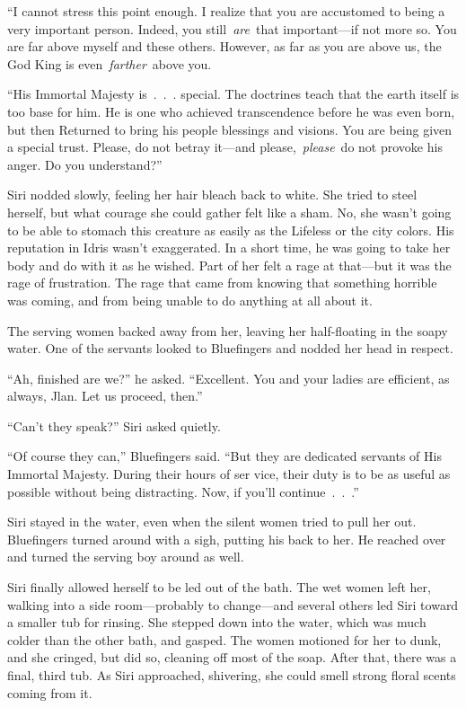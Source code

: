 “I cannot stress this point enough. I realize that you are accustomed to being a very important person. Indeed, you still~\textit{are}~that important—if not more so. You are far above myself and these others. However, as far as you are above us, the God King is even~\textit{farther}~above you.

“His Immortal Majesty is~.~.~. special. The doctrines teach that the earth itself is too base for him. He is one who achieved transcendence before he was even born, but then Returned to bring his people blessings and visions. You are being given a special trust. Please, do not betray it—and please,~\textit{please}~do not provoke his anger. Do you understand?”

Siri nodded slowly, feeling her hair bleach back to white. She tried to steel herself, but what courage she could gather felt like a sham. No, she wasn’t going to be able to stomach this creature as easily as the Lifeless or the city colors. His reputation in Idris wasn’t exaggerated. In a short time, he was going to take her body and do with it as he wished. Part of her felt a rage at that—but it was the rage of frustration. The rage that came from knowing that something horrible was coming, and from being unable to do anything at all about it.

The serving women backed away from her, leaving her half-floating in the soapy water. One of the servants looked to Bluefingers and nodded her head in respect.

“Ah, finished are we?” he asked. “Excellent. You and your ladies are efficient, as always, Jlan. Let us proceed, then.”

“Can’t they speak?” Siri asked quietly.

“Of course they can,” Bluefingers said. “But they are dedicated servants of His Immortal Majesty. During their hours of ser vice, their duty is to be as useful as possible without being distracting. Now, if you’ll continue~.~.~.”

Siri stayed in the water, even when the silent women tried to pull her out. Bluefingers turned around with a sigh, putting his back to her. He reached over and turned the serving boy around as well.

Siri finally allowed herself to be led out of the bath. The wet women left her, walking into a side room—probably to change—and several others led Siri toward a smaller tub for rinsing. She stepped down into the water, which was much colder than the other bath, and gasped. The women motioned for her to dunk, and she cringed, but did so, cleaning off most of the soap. After that, there was a final, third tub. As Siri approached, shivering, she could smell strong floral scents coming from it.

